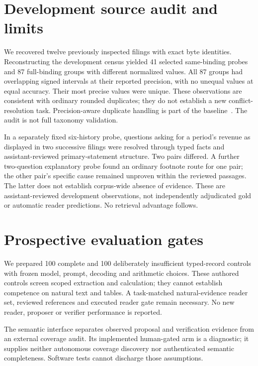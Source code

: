 \section{Development source audit and limits}
We recovered twelve previously inspected filings with exact byte identities.
Reconstructing the development census yielded 41 selected same-binding probes
and 87 full-binding groups with different normalized values. All 87 groups had
overlapping signed intervals at their reported precision, with no unequal values
at equal accuracy. Their most precise values were unique. These observations
are consistent with ordinary rounded duplicates; they do not establish a new
conflict-resolution task. Precision-aware duplicate handling is part of the
baseline~\cite{xbrl2025duplicates}. The audit is not full taxonomy validation.

In a separately fixed six-history probe, questions asking for a period's revenue
as displayed in two successive filings were resolved through typed facts and
assistant-reviewed primary-statement structure. Two pairs differed. A further
two-question explanatory probe found an ordinary footnote route for one pair;
the other pair's specific cause remained unproven within the reviewed passages.
The latter does not establish corpus-wide absence of evidence. These are
assistant-reviewed development observations, not independently adjudicated gold
or automatic reader predictions. No retrieval advantage follows.

\section{Prospective evaluation gates}
We prepared 100 complete and 100 deliberately insufficient typed-record controls
with frozen model, prompt, decoding and arithmetic choices. These authored
controls screen scoped extraction and calculation; they cannot establish
competence on natural text and tables. A task-matched natural-evidence reader
set, reviewed references and executed reader gate remain necessary. No new
reader, proposer or verifier performance is reported.

The semantic interface separates observed proposal and verification evidence
from an external coverage audit. Its implemented human-gated arm is a diagnostic;
it supplies neither autonomous coverage discovery nor authenticated semantic
completeness. Software tests cannot discharge those assumptions.

